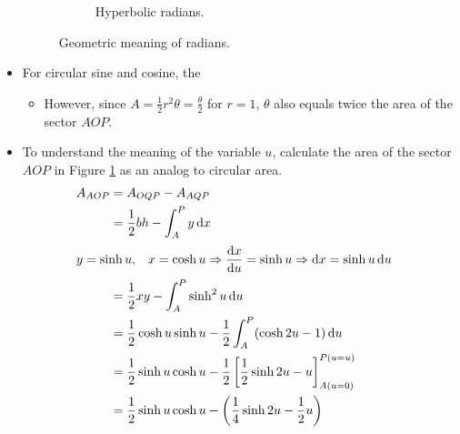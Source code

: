 \documentclass[../main.tex]{subfiles}
\begin{document}
\begin{itemize}
\begin{figure}[h!]
\begin{subfigure}[b]{0.48\linewidth}
            \caption{Hyperbolic radians.}
            \label{fig:hyperbolicGeometricb}
        \end{subfigure}
        \caption{Geometric meaning of radians.}
        \label{fig:hyperbolicGeometric}
    \end{figure}
    \item For circular sine and cosine, the 
    \begin{itemize}
        \item However, since $A=\frac{1}{2}r^2\theta=\frac{\theta}{2}$ for $r=1$, $\theta$ also equals twice the area of the sector $AOP$.
    \end{itemize}
    \item To understand the meaning of the variable $u$, calculate the area of the sector $AOP$ in Figure \ref{fig:hyperbolicGeometricb} as an analog to circular area.
    \begingroup
    \allowdisplaybreaks
    \begin{align*}
        A_{AOP} &= A_{OQP}-A_{AQP}\\
        &= \frac{1}{2}bh - \int_A^P y\dd{x}\\
        \intertext{\centering$
            \begin{aligned}
                y &= \sinh u,&
                x = \cosh u \Rightarrow \dv{x}{u} = \sinh u \Rightarrow \dd x &= \sinh u\dd{u}
            \end{aligned}
        $}
        &= \frac{1}{2}xy - \int_A^P \sinh^2u\dd{u}\\
        &= \frac{1}{2}\cosh u\sinh u - \frac{1}{2}\int_A^P (\cosh 2u-1)\dd{u}\\
        &= \frac{1}{2}\sinh u\cosh u - \frac{1}{2}\left[ \frac{1}{2}\sinh 2u-u \right]_{A(u=0)}^{P(u=u)}\\
        &= \frac{1}{2}\sinh u\cosh u - \left( \frac{1}{4}\sinh 2u-\frac{1}{2}u \right)\\

\end{align*}
\end{itemize}
\end{document}
